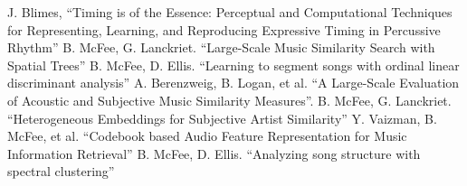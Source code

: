 \documentclass[11pt, twocolumn]{article}
\begin{document}
\begin{thebibliography}{9}
 J. Blimes, “Timing is of the Essence: Perceptual and Computational
Techniques for
      Representing, Learning, and Reproducing Expressive Timing in Percussive
Rhythm”
      B. McFee, G. Lanckriet. “Large-Scale Music Similarity Search with
Spatial Trees”
      B. McFee, D. Ellis. “Learning to segment songs with ordinal linear
discriminant analysis”
      A. Berenzweig, B. Logan, et al. “A Large-Scale Evaluation of Acoustic
and Subjective Music Similarity Measures”.
      B. McFee, G. Lanckriet. “Heterogeneous Embeddings for Subjective Artist
Similarity”
      Y. Vaizman, B. McFee, et al. “Codebook based Audio Feature
Representation for Music Information Retrieval”
      B. McFee, D. Ellis. “Analyzing song structure with spectral
clustering”
\end{thebibliography}
\end{document}
